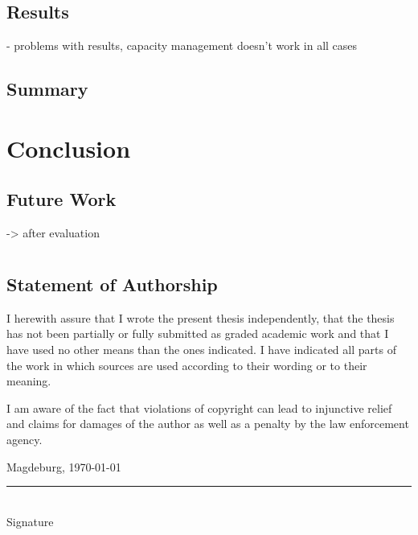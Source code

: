 \documentclass[
	12pt,
	a4paper,
	abstract,
	bibliography=totoc,
	chapterprefix,
	headings=openright,
	numbers=endperiod,
	parskip=half,
	twoside,
]{scrreprt}
\begin{document}
\section{Results}

- problems with results, capacity management doesn't work in all cases

\section{Summary}

\chapter{Conclusion}
\label{cha:conclusion}

\section{Future Work}

-> after evaluation








\appendix




\chapter*{}

\section*{Statement of Authorship}

I herewith assure that I wrote the present thesis independently, that the thesis has not been partially or fully submitted as graded academic work and that I have used no other means than the ones indicated.
I have indicated all parts of the work in which sources are used according to their wording or to their meaning.

I am aware of the fact that violations of copyright can lead to injunctive relief and claims for damages of the author as well as a penalty by the law enforcement agency.

\bigskip

Magdeburg, \today

\bigskip
\bigskip

\rule{0.5\textwidth}{0.5pt}\\
\hspace*{0.25em}Signature
\end{document}
